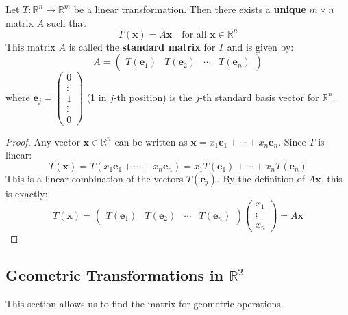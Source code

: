 \begin{theorem}
Let $T: \mathbb{R}^n \to \mathbb{R}^m$ be a linear transformation. Then there exists a \textbf{unique} $m \times n$ matrix $A$ such that
\[ T(\mathbf{x}) = A\mathbf{x} \quad \text{for all } \mathbf{x} \in \mathbb{R}^n \]
This matrix $A$ is called the \textbf{standard matrix} for $T$ and is given by:
\[ A = \begin{pmatrix} T(\mathbf{e}_1) & T(\mathbf{e}_2) & \cdots & T(\mathbf{e}_n) \end{pmatrix} \]
where $\mathbf{e}_j = \begin{pmatrix} 0 \\ \vdots \\ 1 \\ \vdots \\ 0 \end{pmatrix}$ (1 in $j$-th position) is the $j$-th standard basis vector for $\mathbb{R}^n$.
\end{theorem}
\begin{proof}
Any vector $\mathbf{x} \in \mathbb{R}^n$ can be written as $\mathbf{x} = x_1\mathbf{e}_1 + \cdots + x_n\mathbf{e}_n$.
Since $T$ is linear:
\[ T(\mathbf{x}) = T(x_1\mathbf{e}_1 + \cdots + x_n\mathbf{e}_n) = x_1T(\mathbf{e}_1) + \cdots + x_nT(\mathbf{e}_n) \]
This is a linear combination of the vectors $T(\mathbf{e}_j)$.
By the definition of $A\mathbf{x}$, this is exactly:
\[ T(\mathbf{x}) = \begin{pmatrix} T(\mathbf{e}_1) & T(\mathbf{e}_2) & \cdots & T(\mathbf{e}_n) \end{pmatrix} \begin{pmatrix} x_1 \\ \vdots \\ x_n \end{pmatrix} = A\mathbf{x} \]
\end{proof}

\subsection{Geometric Transformations in $\mathbb{R}^2$}
This section allows us to find the matrix for geometric operations.

